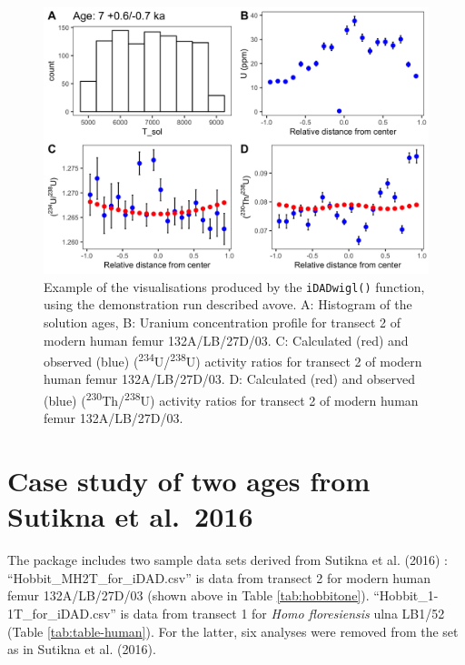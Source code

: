 \documentclass[]{elsarticle} %
\begin{document}
\begin{figure}
\includegraphics[width=0.95\linewidth]{figures/demopanelfig} \caption{Example of the visualisations produced by the \texttt{iDADwigl()} function, using the demonstration run described avove. A: Histogram of the solution ages, B: Uranium concentration profile for transect 2 of modern human femur 132A/LB/27D/03. C: Calculated (red) and observed (blue) (\textsuperscript{234}U/\textsuperscript{238}U) activity ratios for transect 2 of modern human femur 132A/LB/27D/03. D: Calculated (red) and observed (blue) (\textsuperscript{230}Th/\textsuperscript{238}U) activity ratios for transect 2 of modern human femur 132A/LB/27D/03.}\label{fig:demopanelfig}
\end{figure}

\FloatBarrier

\newpage

\hypertarget{case-study-of-two-ages-from-sutikna-et-al.2016}{%
\section{Case study of two ages from Sutikna et al.~2016}\label{case-study-of-two-ages-from-sutikna-et-al.2016}}

The package includes two sample data sets derived from Sutikna et al. (2016) : ``Hobbit\_MH2T\_for\_iDAD.csv'' is data from transect 2 for modern human femur 132A/LB/27D/03 (shown above in Table \ref{tab:hobbitone}). ``Hobbit\_1-1T\_for\_iDAD.csv'' is data from transect 1 for \emph{Homo floresiensis} ulna LB1/52 (Table \ref{tab:table-human}). For the latter, six analyses were removed from the set as in Sutikna et al. (2016).
\end{document}
